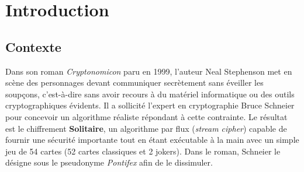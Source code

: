 \documentclass[12pt,a4paper]{article}
\begin{document}
\begin{abstract}
Ce projet s'inscrit dans le cadre du module de Cryptographie de Master 1. Il consiste en l'étude approfondie, l'implémentation stricte et l'analyse statistique du chiffrement par flux \textit{Solitaire} (ou \textit{Pontifex}), conçu par Bruce Schneier en 1999 pour le roman \textit{Cryptonomicon} de Neal Stephenson. L'espace de clés théorique est colossal ($54! \approx 2{,}31 \times 10^{71} \approx 2^{237}$ permutations), mais nos expériences statistiques révèlent un biais structurel mesurable découvert par Paul Crowley : la probabilité de répétition entre deux valeurs consécutives du flux est $1/22{,}5$ au lieu de l'idéal $1/26$. Sur un échantillon de 2\,000 valeurs, nous mesurons une entropie de Shannon $H(X) \approx 4{,}693$ bits (pour un maximum théorique de $4{,}700$ bits) et un indice de coïncidence $\text{IC} \approx 0{,}03839$, confirmant quantitativement ce biais. L'application développée en Python et propulsée par Streamlit intègre trois composantes d'Intelligence Artificielle : un assistant RAG (ChromaDB + Gemini 2.5 Flash), un pipeline de génération des 54 visuels de cartes (Gemini Image + Pillow), et un module d'interprétation analytique (Gemini 2.5 Pro). La suite de 115 tests automatisés valide l'exactitude de l'implémentation, incluant les trois vecteurs officiels de Schneier. Ces résultats confirment que si Solitaire ne satisfait pas aux exigences d'un chiffrement moderne, il conserve une valeur pédagogique exceptionnelle pour l'étude des générateurs pseudo-aléatoires à état interne évolutif.
\end{abstract}

\section{Introduction}

\subsection{Contexte}
Dans son roman \textit{Cryptonomicon} paru en 1999, l'auteur Neal Stephenson met en scène des personnages devant communiquer secrètement sans éveiller les soupçons, c'est-à-dire sans avoir recours à du matériel informatique ou des outils cryptographiques évidents. Il a sollicité l'expert en cryptographie Bruce Schneier pour concevoir un algorithme réaliste répondant à cette contrainte. Le résultat est le chiffrement \textbf{Solitaire}, un algorithme par flux (\textit{stream cipher}) capable de fournir une sécurité importante tout en étant exécutable à la main avec un simple jeu de 54 cartes (52 cartes classiques et 2 jokers). Dans le roman, Schneier le désigne sous le pseudonyme \textit{Pontifex} afin de le dissimuler.
\end{document}
